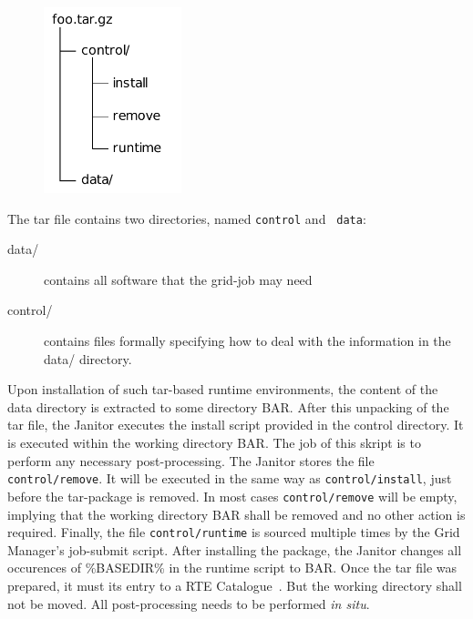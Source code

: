 {\begin{figure}
  \begin{center}
    \includegraphics[width=4cm]{images/tar_folder.pdf}
    \label{fig:tar_folder}
  \end{center}
\end{figure}

The tar file contains two directories, named {\tt control} and {\tt
data}:

\begin{description}
\item [data/] contains all software that the grid-job may need
\item [control/] contains files formally specifying how to deal
	with the information in the data/ directory.
\end{description}

Upon installation of such tar-based runtime environments,
the content of the data directory is extracted to some directory
\textdollar BAR.  After this unpacking of the tar file, the Janitor
executes the install script provided in the control directory.  It is
executed within the working directory \textdollar BAR. The job of
this skript is to perform any necessary post-processing.
The Janitor stores the file \texttt{control/remove}. It will be executed
in the same way as \texttt{control/install}, just before the tar-package
is removed. In most cases \texttt{control/remove} will be empty, implying
that the working directory \textdollar BAR shall be removed and no other
action is required.
Finally, the file \texttt{control/runtime} is sourced multiple times
by the Grid Manager's job-submit script. After installing the package,
the Janitor changes all occurences of \%BASEDIR\% in the runtime script
to \textdollar BAR.  Once the tar file was prepared, it must its entry
to a RTE Catalogue~\cite[p. 10]{BAYER_2007}.
But the working directory shall not be moved. All post-processing needs
to be performed \textit{in situ}.

}
